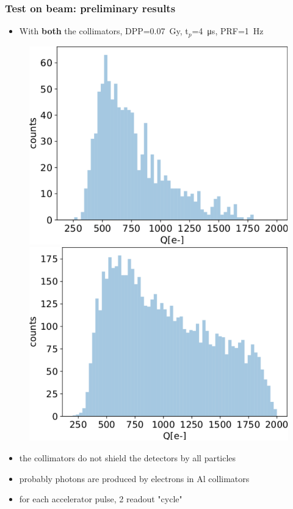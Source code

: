     \begin{frame}
        \frametitle{Test on beam: preliminary results}
        \begin{itemize}
            \item With \textbf{both} the collimators, DPP=\SI{0.07}{Gy}, t$_p$=\SI{4}{\us}, PRF=\SI{1}{Hz}
        \end{itemize}
        \medskip
        \begin{figure}
            \includegraphics[width=0.49\linewidth]{figures/test_beam/Q1_17_11.pdf}
            \includegraphics[width=.49\linewidth]{figures/test_beam/Q2_17_11.pdf}
        \end{figure}
        \begin{itemize}
            \item the collimators do not shield the detectors by all particles
            \item probably photons are produced by electrons in Al collimators
            \item for each accelerator pulse, 2 readout "cycle"  
        \end{itemize}
    \end{frame} 
    
